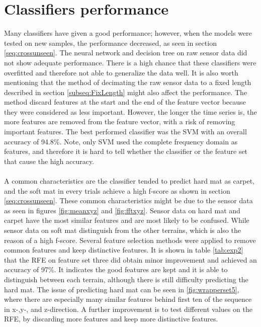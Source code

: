 \documentclass[USenglish]{ifimaster}  %
\begin{document}
\section{Classifiers performance}
Many classifiers have given a good performance; however, when the models were tested on new samples, the performance decreased, as seen in section \ref{seq:crossunseen}. The neural network and decision tree on raw sensor data did not show adequate performance. There is a high chance that these classifiers were overfitted and therefore not able to generalize the data well. It is also worth mentioning that the method of decimating the raw sensor data to a fixed length described in section \ref{subseq:FixLength} might also affect the performance. The method discard features at the start and the end of the feature vector because they were considered as less important. However, the longer the time series is, the more features are removed from the feature vector, with a risk of removing important features. The best performed classifier was the SVM with an overall accuracy of 94.8\%. Note, only SVM used the complete frequency domain as features, and therefore it is hard to tell whether the classifier or the feature set that cause the high accuracy.  
\\
\\
A common characteristics are the classifier tended to predict hard mat as carpet, and the soft mat in every trials achieve a high f-score as shown in section \ref{seq:crossunseen}. These common characteristics might be due to the sensor data as seen in figures \ref{fig:meanxyz} and \ref{fig:fftxyz}. Sensor data on hard mat and carpet have the most similar features and are most likely to be confused. While sensor data on soft mat distinguish from the other terrains, which is also the reason of a high f-score. Several feature selection methods were applied to remove common features and keep distinctive features. It is shown in table \ref{tab:exp2} that the RFE on feature set three did obtain minor improvement and achieved an accuracy of 97\%. It indicates the good features are kept and it is able to distinguish between each terrain, although there is still difficulty predicting the hard mat. The issue of predicting hard mat can be seen in \ref{fig:wrapperset5}, where there are especially many similar features behind first ten of the sequence in x-,y-, and z-direction. A further improvement is to test different values on the RFE, by discarding more features and keep more distinctive features.
	
\end{document}

